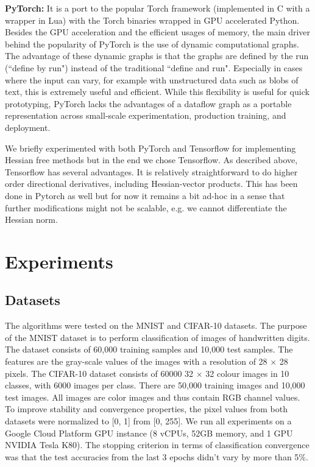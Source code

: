 \documentclass[10pt,twocolumn,letterpaper]{article}
\begin{document}
\textbf{PyTorch: }It is a port to the popular Torch framework (implemented in C with a wrapper in Lua) with the Torch binaries wrapped in GPU accelerated Python. Besides the GPU acceleration and the efficient usages of memory, the main driver behind the popularity of PyTorch is the use of dynamic computational graphs. The advantage of these dynamic graphs is that the graphs are defined by the run (``define by run") instead of the traditional ``define and run". Especially in cases where the input can vary, for example with unstructured data such as blobs of text, this is extremely useful and efficient. While this flexibility is useful for quick prototyping, PyTorch lacks the advantages of a dataflow graph as a portable representation across small-scale experimentation, production training, and deployment.

We briefly experimented with both PyTorch and Tensorflow for implementing Hessian free methods but in the end we chose Tensorflow. As described above, Tensorflow has several advantages. It is relatively straightforward to do higher order directional derivatives, including Hessian-vector products. This has been done in Pytorch as well but for now it remains a bit ad-hoc in a sense that further modifications might not be scalable, e.g. we cannot  differentiate the Hessian norm.


\section{Experiments}
\subsection{Datasets}

The algorithms were tested on the MNIST and CIFAR-10 datasets. The purpose of the MNIST dataset is to perform classification of images of handwritten digits. The dataset consists of 60,000 training samples and 10,000 test samples. The features are the gray-scale values of the images with a resolution of 28 $\times$ 28 pixels. The CIFAR-10 dataset consists of 60000 32 $\times$ 32 colour images in 10 classes, with 6000 images per class. There are 50,000 training images and 10,000 test images. All images are color images and thus contain RGB channel values. To improve stability and convergence properties, the pixel values from both datasets were normalized to [0, 1] from [0, 255]. We run all experiments on a Google Cloud Platform GPU instance (8 vCPUs, 52GB memory, and 1 GPU NVIDIA Tesla K80). The stopping criterion in terms of classification convergence was that the test accuracies from the last 3 epochs didn't vary by more than 5\%.
    
\end{document}
